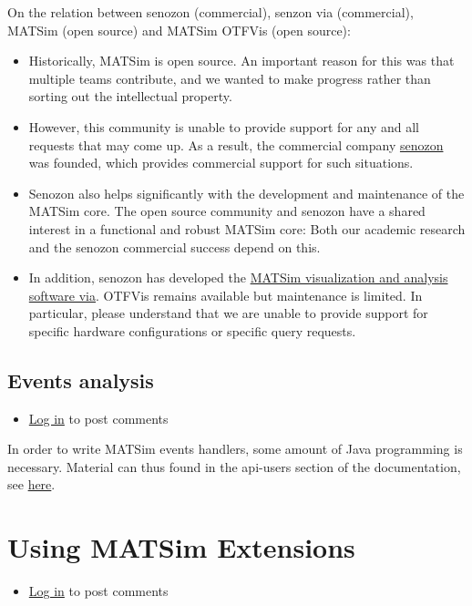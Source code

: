 \documentclass[a4paper,11pt]{report}
\begin{document}
On the relation between senozon (commercial), senzon via (commercial), MATSim (open source) and MATSim OTFVis (open source):
\begin{itemize}
	\item Historically, MATSim is open source. An important reason  for this was that multiple teams contribute, and we wanted to make  progress rather than sorting out the intellectual property.
	\item However, this community is unable to provide support for any and all  requests that may come up. As a result, the commercial company \href{http://www.senzon.com/}{senozon} was founded, which provides commercial support for such situations.
	\item Senozon also helps significantly with the development and  maintenance of the MATSim core. The open source community and senozon  have a shared interest in a functional and robust MATSim core: Both our  academic research and the senozon commercial success depend on this.
	\item In addition, senozon has developed the \href{http://senozon.com/products/via}{MATSim visualization and analysis software via}.  OTFVis remains available but maintenance is limited. In  particular, please understand that we are unable to provide support for  specific hardware configurations or specific query requests.
\end{itemize}

\vfill\eject
\section{Events analysis}
\begin{itemize}
	\item \href{http://www.matsim.org/user/login?destination=comment/reply/743%23comment-form}{Log in} to post comments
\end{itemize}

In  order to write MATSim events handlers, some amount of Java programming  is necessary. Material can thus found in the api-users section of  the documentation, see \href{http://www.matsim.org/node/17}{here}.

\chapter{Using MATSim Extensions}
\begin{itemize}
	\item \href{http://www.matsim.org/user/login?destination=comment/reply/658%23comment-form}{Log in} to post comments
\end{itemize}
\end{document}
